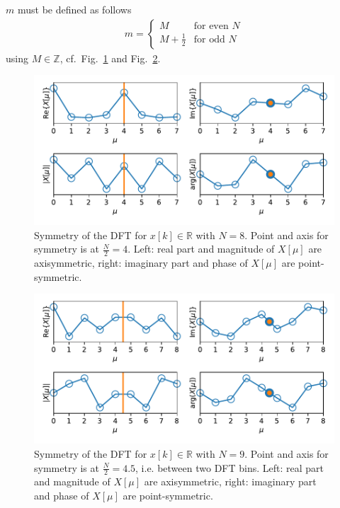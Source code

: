 \documentclass[11pt,a4paper,DIV=12]{scrartcl}
\begin{document}
$m$ must be defined as follows
\begin{align}
m=\begin{cases}M&\text{for even }N\\
M+\frac{1}{2}&\text{for odd }N\end{cases}
\end{align}
%
using $M\in\mathbb{Z}$, cf.~Fig.~\ref{Symmetry_DFT_N8} and Fig.~\ref{Symmetry_DFT_N9}.
%
\begin{figure}
		\centering
		\includegraphics[]{graphics/Symmetry_DFT_N8.pdf}
		\caption{Symmetry of the DFT for $x[k]\in\mathbb{R}$ with $N=8$.
		Point and axis for symmetry is at $\frac{N}{2}=4$.
		Left: real part and magnitude of $X[\mu]$ are axisymmetric,
		right: imaginary part and phase of $X[\mu]$ are point-symmetric.}
		\label{Symmetry_DFT_N8}
\end{figure}
\begin{figure}
		\centering
		\includegraphics[]{graphics/Symmetry_DFT_N9.pdf}
		\caption{Symmetry of the DFT for $x[k]\in\mathbb{R}$ with $N=9$.
		Point and axis for symmetry is at $\frac{N}{2}=4.5$, i.e. between two DFT bins.
		Left: real part and magnitude of $X[\mu]$ are axisymmetric,
		right: imaginary part and phase of $X[\mu]$ are point-symmetric.}
		\label{Symmetry_DFT_N9}
\end{figure}
\end{document}
